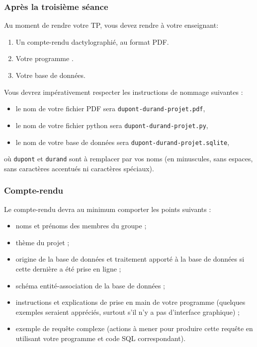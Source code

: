\subsubsection{Après la troisième séance}
Au moment de rendre votre TP, vous devez rendre à votre enseignant:
\begin{enumerate}
\item Un compte-rendu dactylographié, au format PDF.
\item Votre programme \python.
\item Votre base de données.
\end{enumerate}
Vous devrez impérativement respecter les instructions de nommage suivantes : 
\begin{itemize}
    \item le nom de votre fichier PDF sera \texttt{dupont-durand-projet.pdf},
    \item le nom de votre fichier python sera \texttt{dupont-durand-projet.py},
    \item le nom de votre base de données sera \texttt{dupont-durand-projet.sqlite},
\end{itemize}
où \texttt{dupont} et
\texttt{durand} sont à  remplacer par vos noms (en minuscules, sans espaces, sans
caractères accentués ni caractères spéciaux).

\subsubsection{Compte-rendu}

Le compte-rendu devra au minimum comporter les points suivants : 
\begin{itemize}
    \item noms et prénoms des membres du groupe ; 
    \item thème du projet ; 
    \item origine de la base de données et traitement apporté à la base de données si cette dernière a été prise en ligne ; 
    \item schéma entité-association de la base de données ; 
    \item instructions et explications de prise en main de votre programme (quelques exemples seraient appréciés, surtout s'il n'y a pas d'interface graphique) ; 
    \item exemple de requête complexe (actions à mener pour produire cette requête en utilisant votre programme et code SQL correspondant). 
\end{itemize}

